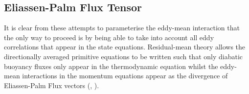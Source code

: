 \documentclass[12pt,a4paper]{report}
\begin{document}
                \subsection{Eliassen-Palm Flux Tensor}
                
                It is clear from these attempts to parameterise the eddy-mean interaction
                that the only way to proceed is by being able to take into account 
                all eddy correlations that appear in the state equations. Residual-mean theory
                allows the directionally averaged primitive equations to be written such that 
                only diabatic buoyancy
                fluxes only appear in the thermodynamic equation whilst the eddy-mean
                interactions in the momentum equations appear as the divergence of Eliassen-Palm 
                Flux vectors (\cite{eliassen1961transfer}, \cite{andrews1976planetary}). 
                
\end{document}
